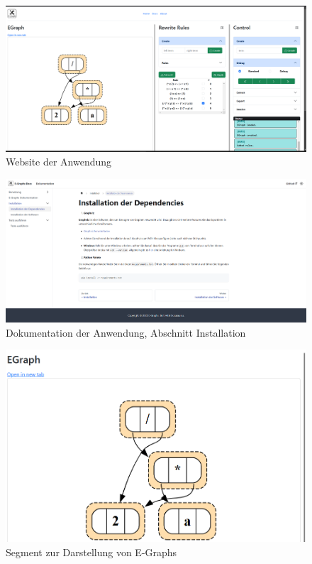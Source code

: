 \newpage
\begin{figure}[H]
\centering
\includegraphics[scale=0.42, angle=90]{../fig/website.png}
\caption{Website der Anwendung}
\label{fig:website}
\end{figure}
\newpage

\begin{figure}[H]
\centering
\includegraphics[scale=0.42, angle=90]{../fig/docs.png}
\caption{Dokumentation der Anwendung, Abschnitt Installation}
\label{fig:docs}
\end{figure}
\newpage

\begin{figure}[H]
    \centering
    \includegraphics[scale=0.5]{../fig/egraphcontrol.png}
    \caption{Segment zur Darstellung von E-Graphs}
    \label{fig:segment1}
\end{figure}

